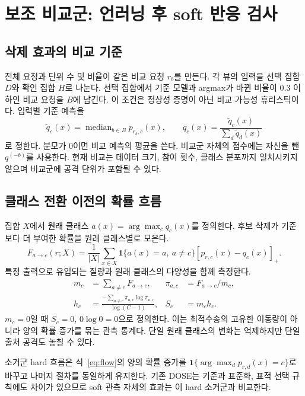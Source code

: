 \documentclass[10pt,a4paper]{article}
\newcommand{\ind}{\mathbf1}
\newcommand{\pos}[1]{\left[#1\right]_+}
\newcommand{\med}{\operatorname{median}}
\begin{document}
\section{보조 비교군: 언러닝 후 soft 반응 검사}
\subsection{삭제 효과의 비교 기준}
전체 요청과 단위 수 및 비율이 같은 비교 요청 $r_b$를 만든다.
각 뷰의 입력을 선택 집합 $D$와 확인 집합 $H$로 나눈다.
선택 집합에서 기준 모델과 argmax가 바뀐 비율이 $0.3$ 이하인 비교 요청을 $B$에 남긴다.
이 조건은 정상성 증명이 아닌 비교 가능성 휴리스틱이다.
입력별 기준 예측을
\begin{equation}
 \widetilde q_c(x)=\med_{b\in B}p_{r_b,c}(x),\qquad
 q_c(x)=\frac{\widetilde q_c(x)}{\sum_d\widetilde q_d(x)}
\end{equation}
로 정한다. 분모가 0이면 비교 예측의 평균을 쓴다.
비교군 자체의 점수에는 자신을 뺀 $q^{(-b)}$를 사용한다.
현재 비교는 데이터 크기, 참여 횟수, 클래스 분포까지 일치시키지 않으며
비교군에 공격 단위가 포함될 수 있다.

\subsection{클래스 전환 이전의 확률 흐름}
집합 $X$에서 원래 클래스 $a(x)=\arg\max_c q_c(x)$를 정의한다.
후보 삭제가 기준보다 더 부여한 확률을 원래 클래스별로 모은다.
\begin{equation}\label{eq:flow}
 F_{a\to c}(r;X)=\frac1{|X|}\sum_{x\in X}
 \ind\{a(x)=a,\ a\ne c\}\pos{p_{r,c}(x)-q_c(x)}.
\end{equation}
특정 출력으로 유입되는 질량과 원래 클래스의 다양성을 함께 측정한다.
\begin{align}
 m_c&=\sum_{a\ne c}F_{a\to c},& \pi_{a,c}&=F_{a\to c}/m_c,\\
 h_c&=\frac{-\sum_{a\ne c}\pi_{a,c}\log\pi_{a,c}}{\log(C-1)},& S_c&=m_ch_c.
\end{align}
$m_c=0$일 때 $S_c=0$, $0\log0=0$으로 정의한다.
이는 최적수송의 고유한 이동량이 아니라 양의 확률 증가를 묶는 관측 통계다.
단일 원래 클래스의 변화는 억제하지만 단일 출처 공격도 놓칠 수 있다.

소거군 hard 흐름은 식~\eqref{eq:flow}의 양의 확률 증가를
$\ind\{\arg\max_d p_{r,d}(x)=c\}$로 바꾸고 나머지 절차를 동일하게 유지한다.
기존 DOSE는 기준과 표준화, 표적 선택 규칙에도 차이가 있으므로
soft 관측 자체의 효과는 이 hard 소거군과 비교한다.
\end{document}
